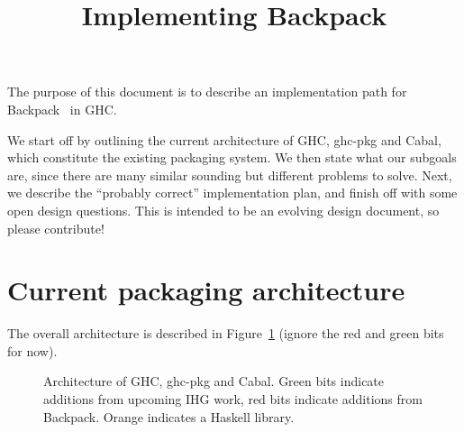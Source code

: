 \documentclass{article}
\title{Implementing Backpack}
\begin{document}
\maketitle

The purpose of this document is to describe an implementation path
for Backpack~\cite{Kilpatrick:2014:BRH:2535838.2535884} in GHC\@.

We start off by outlining the current architecture of GHC, ghc-pkg and Cabal,
which constitute the existing packaging system.  We then state what our subgoals
are, since there are many similar sounding but different problems to solve.  Next,
we describe the ``probably correct'' implementation plan, and finish off with
some open design questions.  This is intended to be an evolving design document,
so please contribute!

\section{Current packaging architecture}

The overall architecture is described in Figure~\ref{fig:arch} (ignore
the red and green bits for now).

\begin{figure}[H]
\label{fig:arch}\caption{Architecture of GHC, ghc-pkg and Cabal. Green bits indicate additions from upcoming IHG work, red bits indicate additions from Backpack.  Orange indicates a Haskell library.}
\end{figure}
\end{document}
